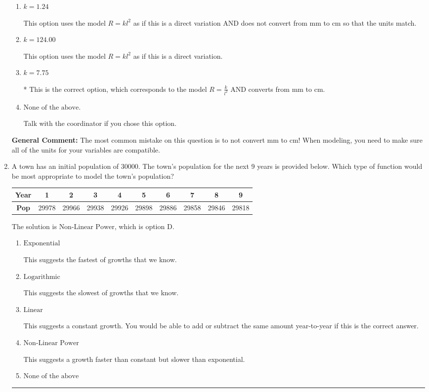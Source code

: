 \documentclass{extbook}[14pt]
\newcommand{\litem}[1]{\item #1

\rule{\textwidth}{0.4pt}}
\begin{document}
\begin{enumerate}
{\begin{enumerate}[label=\Alph*.]
This option uses the correct model, $R = \frac{k}{l^{2}}$, but does not convert from mm to cm so that the units match.
\item \( k = 1.24 \)

This option uses the model $R = kl^{2}$ as if this is a direct variation AND does not convert from mm to cm so that the units match.
\item \( k = 124.00 \)

This option uses the model $R = kl^{2}$ as if this is a direct variation.
\item \( k = 7.75 \)

* This is the correct option, which corresponds to the model $R = \frac{k}{l^{2}}$ AND converts from mm to cm.
\item \( \text{None of the above.} \)

Talk with the coordinator if you chose this option.
\end{enumerate}

\textbf{General Comment:} The most common mistake on this question is to not convert mm to cm! When modeling, you need to make sure all of the units for your variables are compatible.
}
\litem{
A town has an initial population of 30000. The town's population for the next 9 years is provided below. Which type of function would be most appropriate to model the town's population?


\begin{tabular}{c|c|c|c|c|c|c|c|c|c}
\textbf{Year} &1 &2 &3 &4 &5 &6 &7 &8 &9\tabularnewline \hline
\textbf{Pop} &29978 &29966 &29938 &29926 &29898 &29886 &29858 &29846 &29818\end{tabular}The solution is \( \text{Non-Linear Power} \), which is option D.\begin{enumerate}[label=\Alph*.]
\item \( \text{Exponential} \)

This suggests the fastest of growths that we know.
\item \( \text{Logarithmic} \)

This suggests the slowest of growths that we know.
\item \( \text{Linear} \)

This suggests a constant growth. You would be able to add or subtract the same amount year-to-year if this is the correct answer.
\item \( \text{Non-Linear Power} \)

This suggests a growth faster than constant but slower than exponential.
\item \( \text{None of the above} \)


\end{enumerate}}
\end{enumerate}
\end{document}
